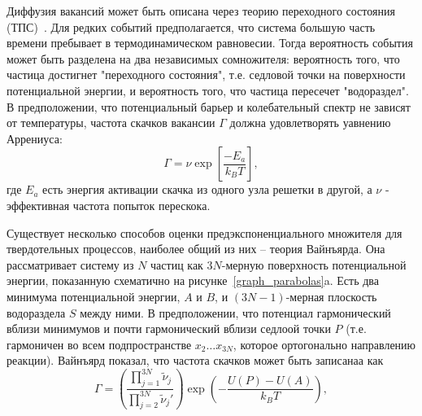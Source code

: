 \documentclass[master,14pt,subf,href,colorlinks=true
]{disser}
\begin{document}
Диффузия вакансий может быть описана через теорию переходного состояния (ТПС)~\cite{TST}. Для редких событий предполагается, что система большую часть времени пребывает в термодинамическом равновесии. Тогда вероятность события может быть разделена на два независимых сомножителя: вероятность того, что частица достигнет "переходного состояния", т.е. седловой точки на поверхности потенциальной энергии, и вероятность того, что частица пересечет "водораздел".
В предположении, что потенциальный барьер и колебательный спектр не зависят от температуры, частота скачков вакансии $\Gamma$ должна удовлетворять уавнению Аррениуса:
\begin{equation}
	\Gamma = \nu  \exp\left[\frac{-E_a}{k_BT} \right],
\end{equation}
где $E_a$ есть энергия активации скачка из одного узла решетки в другой,
а $\nu$ - эффективная частота попыток перескока.

Существует несколько способов оценки предэкспоненциального множителя для твердотельных процессов, наиболее общий из них -- теория Вайнъярда\cite{Vineyard}.
Она рассматривает систему из $N$ частиц как $3N$-мерную поверхность потенциальной энергии, показанную схематично на рисунке~\ref{graph_parabolas}a.
Есть два минимума потенциальной энергии, $A$ и $B$, и $(3N-1)$-мерная плоскость водораздела $S$ между ними. В предположении, что потенциал гармонический вблизи минимумов и почти гармонический вблизи седлоой точки $P$ (т.е. гармоничен во всем подпространстве $x_{2} \ldots x_{3N}$, которое ортогонально направлению реакции).
Вайнъярд показал, что частота скачков может быть записанаа как
\begin{equation}\label{Vineyard_first}
	\Gamma = \left( \frac{\prod\limits_{j=1}^{3N} {\tilde{\nu}_j} } {\prod\limits_{j=2}^{3N} {\tilde{\nu}_j'} } \right) \exp\left( - \frac{U(P) - U(A)} {k_BT} \right),
\end{equation}
\end{document}
